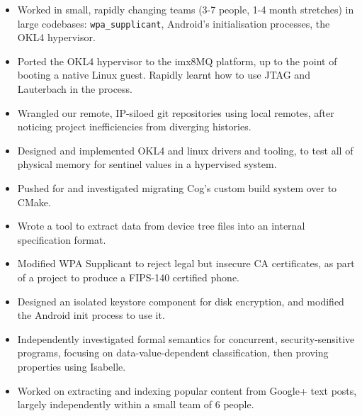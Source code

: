 \documentclass[10pt,a4paper,ragged2e]{altacv}
\begin{document}
\divider

\begin{itemize}
\item Worked in small, rapidly changing teams (3-7 people, 1-4 month stretches) in large codebases: \texttt{wpa\_supplicant}, Android's initialisation processes, the OKL4 hypervisor.
\item Ported the OKL4 hypervisor to the imx8MQ platform, up to the point of booting a native Linux guest. Rapidly learnt how to use JTAG and Lauterbach in the process.
\item Wrangled our remote, IP-siloed git repositories using local remotes, after noticing project inefficiencies from diverging histories.
\item Designed and implemented OKL4 and linux drivers and tooling, to test all of physical memory for sentinel values in a hypervised system.
\item Pushed for and investigated migrating Cog's custom build system over to CMake.
\item Wrote a tool to extract data from device tree files into an internal specification format.
\item Modified WPA Supplicant to reject legal but insecure CA certificates, as part of a project to produce a FIPS-140 certified phone.
\item Designed an isolated keystore component for disk encryption, and modified the Android init process to use it.
\end{itemize}

\divider

\begin{itemize}
\item Independently investigated formal semantics for concurrent, security-sensitive programs, focusing on data-value-dependent classification, then proving properties using Isabelle.
\end{itemize}

\vspace{3mm}

\begin{itemize}
\item Worked on extracting and indexing popular content from Google+ text posts, largely independently within a small team of 6 people.
\end{itemize}
\end{document}
